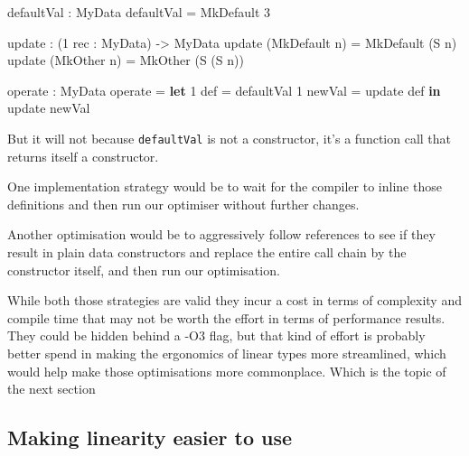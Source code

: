 \documentclass[
]{article}
\newenvironment{Shaded}{}{}
\newcommand{\DataTypeTok}[1]{\textcolor[rgb]{0.56,0.13,0.00}{#1}}
\newcommand{\DecValTok}[1]{\textcolor[rgb]{0.25,0.63,0.44}{#1}}
\newcommand{\KeywordTok}[1]{\textcolor[rgb]{0.00,0.44,0.13}{\textbf{#1}}}
\newcommand{\NormalTok}[1]{#1}
\newcommand{\OperatorTok}[1]{\textcolor[rgb]{0.40,0.40,0.40}{#1}}
\newcommand{\OtherTok}[1]{\textcolor[rgb]{0.00,0.44,0.13}{#1}}
\begin{document}
\begin{Shaded}
\begin{Highlighting}[]
\NormalTok{defaultVal }\OperatorTok{:} \DataTypeTok{MyData}
\NormalTok{defaultVal }\OtherTok{=} \DataTypeTok{MkDefault} \DecValTok{3}

\NormalTok{update }\OperatorTok{:}\NormalTok{ (}\DecValTok{1}\NormalTok{ rec }\OperatorTok{:} \DataTypeTok{MyData}\NormalTok{) }\OtherTok{{-}\textgreater{}} \DataTypeTok{MyData}
\NormalTok{update (}\DataTypeTok{MkDefault}\NormalTok{ n) }\OtherTok{=} \DataTypeTok{MkDefault}\NormalTok{ (}\DataTypeTok{S}\NormalTok{ n)}
\NormalTok{update (}\DataTypeTok{MkOther}\NormalTok{ n) }\OtherTok{=} \DataTypeTok{MkOther}\NormalTok{ (}\DataTypeTok{S}\NormalTok{ (}\DataTypeTok{S}\NormalTok{ n))}

\NormalTok{operate }\OperatorTok{:} \DataTypeTok{MyData}
\NormalTok{operate }\OtherTok{=} \KeywordTok{let} \DecValTok{1}\NormalTok{ def }\OtherTok{=}\NormalTok{ defaultVal}
              \DecValTok{1}\NormalTok{ newVal }\OtherTok{=}\NormalTok{ update def }\KeywordTok{in}
\NormalTok{              update newVal}
\end{Highlighting}
\end{Shaded}

But it will not because \texttt{defaultVal} is not a constructor, it's a
function call that returns itself a constructor.

One implementation strategy would be to wait for the compiler to inline
those definitions and then run our optimiser without further changes.

Another optimisation would be to aggressively follow references to see
if they result in plain data constructors and replace the entire call
chain by the constructor itself, and then run our optimisation.

While both those strategies are valid they incur a cost in terms of
complexity and compile time that may not be worth the effort in terms of
performance results. They could be hidden behind a -O3 flag, but that
kind of effort is probably better spend in making the ergonomics of
linear types more streamlined, which would help make those optimisations
more commonplace. Which is the topic of the next section

\hypertarget{making-linearity-easier-to-use}{%
\subsection{Making linearity easier to
use}\label{making-linearity-easier-to-use}}
\end{document}
